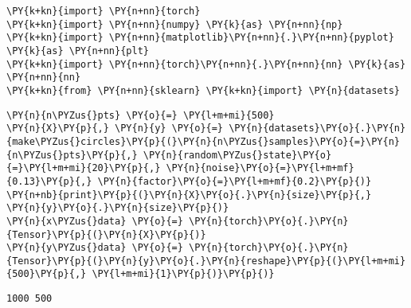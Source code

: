     \begin{tcolorbox}[breakable, size=fbox, boxrule=1pt, pad at break*=1mm,colback=cellbackground, colframe=cellborder]
\begin{Verbatim}[commandchars=\\\{\}]
\PY{k+kn}{import} \PY{n+nn}{torch}
\PY{k+kn}{import} \PY{n+nn}{numpy} \PY{k}{as} \PY{n+nn}{np}
\PY{k+kn}{import} \PY{n+nn}{matplotlib}\PY{n+nn}{.}\PY{n+nn}{pyplot} \PY{k}{as} \PY{n+nn}{plt}
\PY{k+kn}{import} \PY{n+nn}{torch}\PY{n+nn}{.}\PY{n+nn}{nn} \PY{k}{as} \PY{n+nn}{nn}
\PY{k+kn}{from} \PY{n+nn}{sklearn} \PY{k+kn}{import} \PY{n}{datasets}
\end{Verbatim}
\end{tcolorbox}

    \begin{tcolorbox}[breakable, size=fbox, boxrule=1pt, pad at break*=1mm,colback=cellbackground, colframe=cellborder]
\begin{Verbatim}[commandchars=\\\{\}]
\PY{n}{n\PYZus{}pts} \PY{o}{=} \PY{l+m+mi}{500}
\PY{n}{X}\PY{p}{,} \PY{n}{y} \PY{o}{=} \PY{n}{datasets}\PY{o}{.}\PY{n}{make\PYZus{}circles}\PY{p}{(}\PY{n}{n\PYZus{}samples}\PY{o}{=}\PY{n}{n\PYZus{}pts}\PY{p}{,} \PY{n}{random\PYZus{}state}\PY{o}{=}\PY{l+m+mi}{20}\PY{p}{,} \PY{n}{noise}\PY{o}{=}\PY{l+m+mf}{0.13}\PY{p}{,} \PY{n}{factor}\PY{o}{=}\PY{l+m+mf}{0.2}\PY{p}{)}
\PY{n+nb}{print}\PY{p}{(}\PY{n}{X}\PY{o}{.}\PY{n}{size}\PY{p}{,} \PY{n}{y}\PY{o}{.}\PY{n}{size}\PY{p}{)}
\PY{n}{x\PYZus{}data} \PY{o}{=} \PY{n}{torch}\PY{o}{.}\PY{n}{Tensor}\PY{p}{(}\PY{n}{X}\PY{p}{)}
\PY{n}{y\PYZus{}data} \PY{o}{=} \PY{n}{torch}\PY{o}{.}\PY{n}{Tensor}\PY{p}{(}\PY{n}{y}\PY{o}{.}\PY{n}{reshape}\PY{p}{(}\PY{l+m+mi}{500}\PY{p}{,} \PY{l+m+mi}{1}\PY{p}{)}\PY{p}{)}
\end{Verbatim}
\end{tcolorbox}

    \begin{Verbatim}[commandchars=\\\{\}]
1000 500
    \end{Verbatim}

